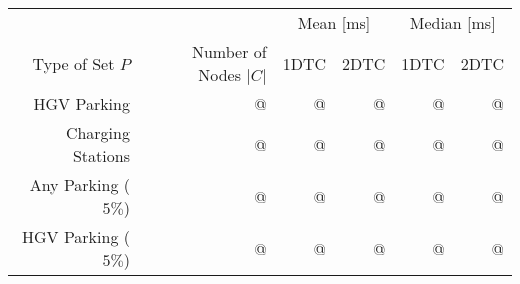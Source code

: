 \begin{tabular}{rrrrrr}
	\toprule
	                    &                       & \multicolumn{2}{c}{Mean [\si{\milli\second}]} & \multicolumn{2}{c}{Median [\si{\milli\second}]}               \\
	Type of Set $P$     & Number of Nodes $|C|$ & 1DTC                                          & 2DTC                                            & 1DTC & 2DTC \\
	\midrule
	HGV Parking         & @                     & @                                             & @                                               & @    & @    \\
	Charging Stations   & @                     & @                                             & @                                               & @    & @    \\
	Any Parking ($5\%$) & @                     & @                                             & @                                               & @    & @    \\
	HGV Parking ($5\%$) & @                     & @                                             & @                                               & @    & @    \\
	\bottomrule
\end{tabular}